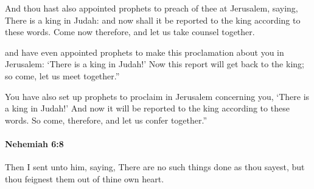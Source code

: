 			\begin{versebox}
					\item[BHS] 
					\item[LXX] 
					\item[ASV] And thou hast also appointed prophets to preach of thee at Jerusalem, saying, There is a king in Judah: and now shall it be reported to the king according to these words. Come now therefore, and let us take counsel together.
					\item[NIV] and have even appointed prophets to make this proclamation about you in Jerusalem: ‘There is a king in Judah!’ Now this report will get back to the king; so come, let us meet together.”
					\item[NRSV] You have also set up prophets to proclaim in Jerusalem concerning you, ‘There is a king in Judah!’ And now it will be reported to the king according to these words. So come, therefore, and let us confer together.”
			\end{versebox}

		\paragraph{Nehemiah 6:8} %
			\label{NEHEMIAH-6-8}

			Then I sent unto him, saying, There are no such things done as thou sayest, but thou feignest them out of thine own heart.

